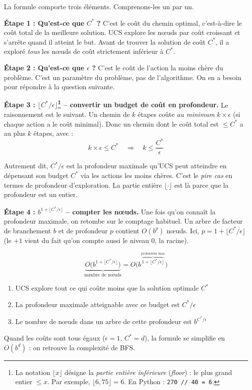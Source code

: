 \documentclass[11pt,a4paper]{article}
\begin{document}
La formule comporte trois éléments. Comprenons-les un par un.

\textbf{Étape 1 : Qu'est-ce que $C^*$ ?} C'est le coût du chemin optimal, c'est-à-dire le coût total de la meilleure solution. UCS explore les nœuds par coût croissant et s'arrête quand il atteint le but. Avant de trouver la solution de coût $C^*$, il a exploré \textit{tous} les nœuds de coût strictement inférieur à $C^*$.

\textbf{Étape 2 : Qu'est-ce que $\epsilon$ ?} C'est le coût de l'action la moins chère du problème. C'est un paramètre du problème, pas de l'algorithme. On en a besoin pour répondre à la question suivante.

\textbf{Étape 3 : $\lfloor C^*/\epsilon \rfloor$\footnote{La notation $\lfloor x \rfloor$ désigne la \textit{partie entière inférieure} (\textit{floor}) : le plus grand entier $\leq x$. Par exemple, $\lfloor 6{,}75 \rfloor = 6$. En Python : \texttt{270 // 40 = 6}.} -- convertir un budget de coût en profondeur.} Le raisonnement est le suivant. Un chemin de $k$ étapes coûte \textit{au minimum} $k \times \epsilon$ (si chaque action a le coût minimal). Donc un chemin dont le coût total est $\leq C^*$ a au plus $k$ étapes, avec :
$$k \times \epsilon \leq C^* \quad \Longrightarrow \quad k \leq \frac{C^*}{\epsilon}$$

Autrement dit, $C^*/\epsilon$ est la profondeur maximale qu'UCS peut atteindre en dépensant son budget $C^*$ via les actions les moins chères. C'est le \textit{pire cas} en termes de profondeur d'exploration. La partie entière $\lfloor \cdot \rfloor$ est là parce que la profondeur est un entier.

\textbf{Étape 4 : $b^{1+\lfloor C^*/\epsilon \rfloor}$ -- compter les nœuds.} Une fois qu'on connaît la profondeur maximale, on retombe sur le comptage habituel. Un arbre de facteur de branchement $b$ et de profondeur $p$ contient $O(b^p)$ nœuds. Ici, $p = 1 + \lfloor C^*/\epsilon \rfloor$ (le $+1$ vient du fait qu'on compte aussi le niveau 0, la racine).

\begin{attentionbox}
$$\underbrace{O\Big(b^{1+\lfloor C^*/\epsilon \rfloor}\Big)}_{\text{nombre de n\oe uds}} = O\Big(b^{\overbrace{\scriptstyle 1+\lfloor C^*/\epsilon \rfloor}^{\text{profondeur max}}}\Big)$$

\begin{enumerate}
    \item UCS explore tout ce qui coûte moins que la solution optimale $C^*$
    \item La profondeur maximale atteignable avec ce budget est $C^*/\epsilon$
    \item Le nombre de n\oe uds dans un arbre de cette profondeur est $b^{C^*/\epsilon}$
\end{enumerate}

Quand les coûts sont tous égaux ($\epsilon = 1$, $C^* = d$), la formule se simplifie en $O(b^d)$ : on retrouve la complexité de BFS.
\end{attentionbox}
\end{document}

